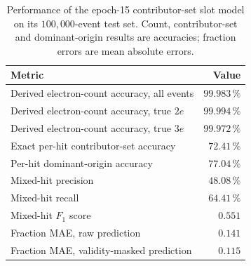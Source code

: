 \begin{table}[htbp]
    \centering
    \small
    \setlength{\tabcolsep}{8pt}
    \caption{Performance of the epoch-15 contributor-set slot model on its
    \(100{,}000\)-event test set. Count, contributor-set and dominant-origin
    results are accuracies; fraction errors are mean absolute errors.}
    \label{tab:results_contributor_performance}
    \begin{tabular}{lr}
        \hline
        Metric & Value \\
        \hline
        Derived electron-count accuracy, all events & \(99.983\,\%\) \\
        Derived electron-count accuracy, true \(2e\) & \(99.994\,\%\) \\
        Derived electron-count accuracy, true \(3e\) & \(99.972\,\%\) \\
        Exact per-hit contributor-set accuracy & \(72.41\,\%\) \\
        Per-hit dominant-origin accuracy & \(77.04\,\%\) \\
        Mixed-hit precision & \(48.08\,\%\) \\
        Mixed-hit recall & \(64.41\,\%\) \\
        Mixed-hit \(F_1\) score & \(0.551\) \\
        Fraction MAE, raw prediction & \(0.141\) \\
        Fraction MAE, validity-masked prediction & \(0.115\) \\
        \hline
    \end{tabular}
\end{table}

